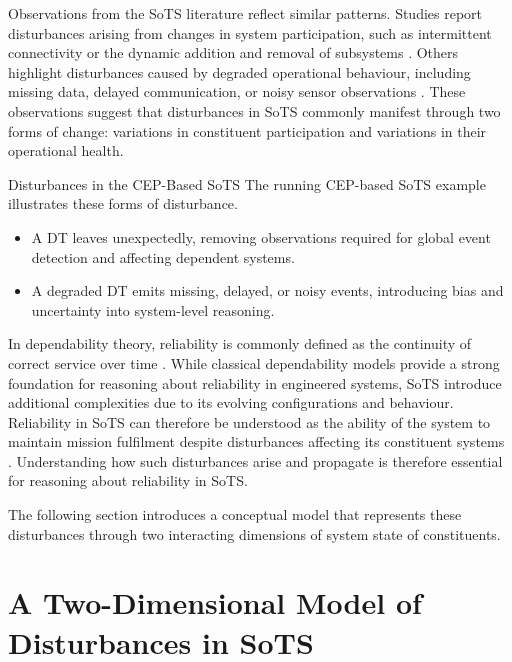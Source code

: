 Observations from the SoTS literature reflect similar patterns. Studies report disturbances arising from changes in system participation, such as intermittent connectivity or the dynamic addition and removal of subsystems \cite{parri2019jarvis,human2023design,howard2021greenhouse}. Others highlight disturbances caused by degraded operational behaviour, including missing data, delayed communication, or noisy sensor observations \cite{esterle2021digital,gill2022method,chen2018digital,duan2023digital}. These observations suggest that disturbances in SoTS commonly manifest through two forms of change: variations in constituent participation and variations in their operational health.

\begin{runningexample}{Disturbances in the CEP-Based SoTS}
The running CEP-based SoTS example illustrates these forms of disturbance.

\begin{center}

\end{center}
\begin{itemize}[noitemsep]
    \item A DT leaves unexpectedly, removing observations required for global event detection and affecting dependent systems.
    \item A degraded DT emits missing, delayed, or noisy events, introducing bias and uncertainty into system-level reasoning.
\end{itemize}
\end{runningexample}

In dependability theory, reliability is commonly defined as the continuity of correct service over time \cite{avizienis2004basic}. While classical dependability models provide a strong foundation for reasoning about reliability in engineered systems, SoTS introduce additional complexities due to its evolving configurations and behaviour. Reliability in SoTS can therefore be understood as the ability of the system to maintain mission fulfilment despite disturbances affecting its constituent systems \cite{ferreira2023towards}. Understanding how such disturbances arise and propagate is therefore essential for reasoning about reliability in SoTS.

The following section introduces a conceptual model that represents these disturbances through two interacting dimensions of system state of constituents.

\section{A Two-Dimensional Model of Disturbances in SoTS}\label{sec:two-dimensional-disturbances}

